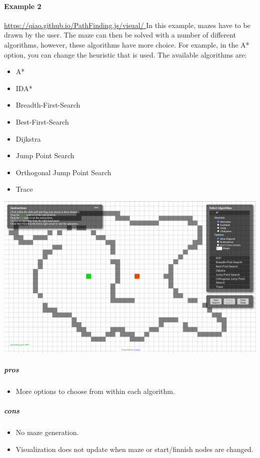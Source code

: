 \documentclass{article}
\begin{document}
\paragraph{Example 2}
\href{https://qiao.github.io/PathFinding.js/visual/
}{https://qiao.github.io/PathFinding.js/visual/
}
\newline
In this example, mazes have to be drawn by the user. The maze can then be solved with a number of different algorithms, however, these algorithms have more choice. For example, in the A* option, you can change the heuristic that is used. The available algorithms are:
\begin{itemize}
    \item A*
    \item IDA*
    \item Breadth-First-Search
    \item Best-First-Search
    \item Dijkstra
    \item Jump Point Search
    \item Orthogonal Jump Point Search
    \item Trace
\end{itemize}
\includegraphics[width=\linewidth]{assets/Existing Solutions/example 2.PNG}
\subparagraph*{pros}
\begin{itemize}
    \item More options to choose from within each algorithm.
\end{itemize}
\subparagraph*{cons}
\begin{itemize}
    \item No maze generation.
    \item Visualization does not update when maze or start/finnish nodes are changed.
\end{itemize}
\end{document}
